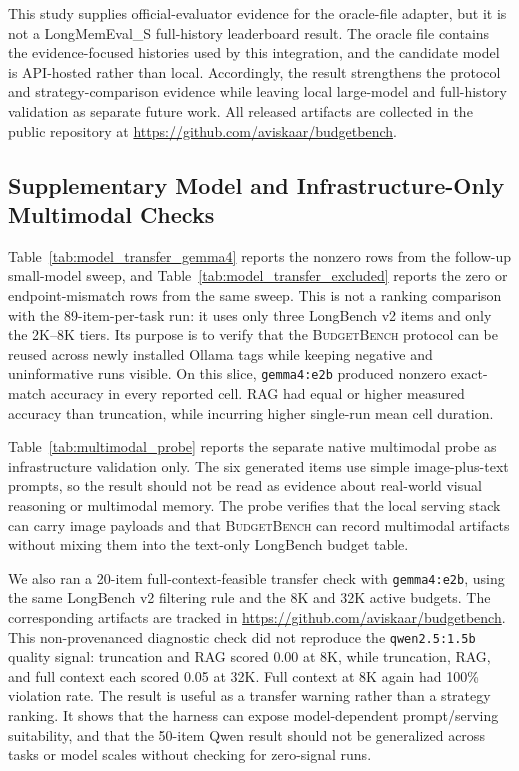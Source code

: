 \documentclass[11pt]{article}
\newcommand{\BudgetBench}{\textsc{BudgetBench}}
\newcommand{\RunModel}{\texttt{qwen2.5:1.5b}}
\newcommand{\RepoURL}{\url{https://github.com/aviskaar/budgetbench}}
\begin{document}
This study supplies official-evaluator evidence for the oracle-file adapter,
but it is not a LongMemEval\_S full-history leaderboard result.  The oracle file
contains the evidence-focused histories used by this integration, and the
candidate model is API-hosted rather than local.  Accordingly, the result
strengthens the protocol and strategy-comparison evidence while leaving local
large-model and full-history validation as separate future work.  All released
artifacts are collected in the public repository at \RepoURL{}.

\subsection{Supplementary Model and Infrastructure-Only Multimodal Checks}

Table~\ref{tab:model_transfer_gemma4} reports the nonzero rows from the
follow-up small-model sweep, and Table~\ref{tab:model_transfer_excluded}
reports the zero or endpoint-mismatch rows from the same sweep.  This is not a
ranking comparison with the 89-item-per-task run: it uses only three LongBench
v2 items and only the 2K--8K tiers.  Its purpose is to verify that the
\BudgetBench{} protocol can be reused across newly installed Ollama tags while
keeping negative and uninformative runs visible.  On this slice,
\texttt{gemma4:e2b} produced nonzero exact-match accuracy in every reported
cell.  RAG had equal or higher measured accuracy than truncation, while
incurring higher single-run mean cell duration.

Table~\ref{tab:multimodal_probe} reports the separate native multimodal probe
as infrastructure validation only.  The six generated items use simple
image-plus-text prompts, so the result should not be read as evidence about
real-world visual reasoning or multimodal memory.  The probe verifies that the
local serving stack can carry image payloads and that \BudgetBench{} can record
multimodal artifacts without mixing them into the text-only LongBench budget
table.



We also ran a 20-item full-context-feasible transfer check with
\texttt{gemma4:e2b}, using the same LongBench v2 filtering rule and the 8K and
32K active budgets.  The corresponding artifacts are tracked in \RepoURL{}.
This non-provenanced diagnostic check did not
reproduce the \RunModel{} quality signal: truncation and RAG scored 0.00 at
8K, while truncation, RAG, and full context each scored 0.05 at 32K.  Full
context at 8K again had 100\% violation rate.  The result is useful as a
transfer warning rather than a strategy ranking.  It shows that the harness
can expose model-dependent prompt/serving suitability, and that the 50-item
Qwen result should not be generalized across tasks or model scales without
checking for zero-signal runs.
\end{document}

